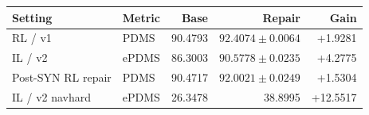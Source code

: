 \begin{tabular}{llrrr}
\toprule
Setting & Metric & Base & Repair & Gain \\
\midrule
RL / v1 & PDMS & 90.4793 & $92.4074 \pm 0.0064$ & +1.9281 \\
IL / v2 & ePDMS & 86.3003 & $90.5778 \pm 0.0235$ & +4.2775 \\
Post-SYN RL repair & PDMS & 90.4717 & $92.0021 \pm 0.0249$ & +1.5304 \\
\midrule
IL / v2 navhard & ePDMS & 26.3478 & 38.8995 & +12.5517 \\
\bottomrule
\end{tabular}
